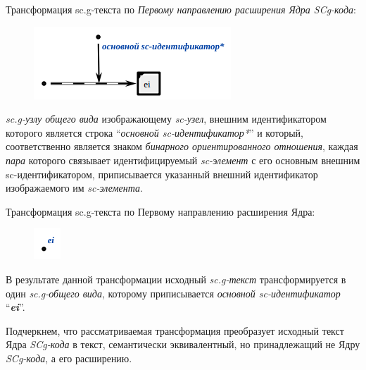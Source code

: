 \bigskip
Трансформация sc.g-текста по \textit{Первому направлению расширения Ядра SCg-кода}:
\begin{figure}[h]
	\centering
	\includegraphics[scale=0.8]{images/intro/scg/scg_transf2.png}
\end{figure}
\textit{sc.g-узлу общего вида} изображающему \textit{sc-узел}, внешним идентификатором которого является строка ``\textit{основной sc-идентификатор*}'' и который, соответственно является знаком \textit{бинарного ориентированного отношения}, каждая \textit{пара} которого связывает идентифицируемый \textit{sc-элемент} с его основным внешним sc-идентификатором, приписывается указанный внешний идентификатор изображаемого им \textit{sc-элемента}.

\bigskip
Трансформация sc.g-текста по Первому направлению расширения Ядра:
\begin{figure}[h]
	\centering
	\includegraphics[scale=0.8]{images/intro/scg/scg_transf3.png}
\end{figure}

В результате данной трансформации исходный \mbox{\textit{sc.g-текст}} трансформируется в один \textit{sc.g-общего вида}, которому приписывается \textit{основной sc-идентификатор} ``\textit{\textbf{ei}}''.

Подчеркнем, что рассматриваемая трансформация преобразует исходный текст Ядра \textit{SCg-кода} в текст, семантически эквивалентный, но принадлежащий не Ядру \textit{SCg-кода}, а его расширению.

\begin{SCn}
\end{SCn}

